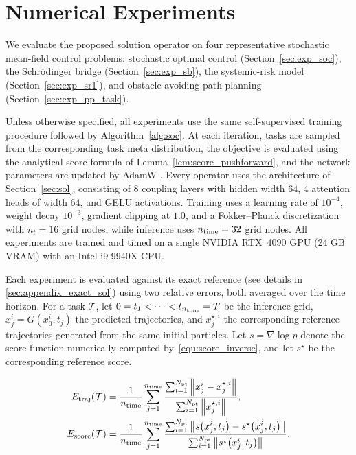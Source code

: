\documentclass[preprint]{elsarticle}
\newcommand{\qb}[1]{\bigl(#1\bigr)}          %
\newcommand{\norm}[1]{\left\|#1\right\|}
\newcommand{\sT}{\mathcal{T}}
\begin{document}
\section{Numerical Experiments}\label{sec:results}

We evaluate the proposed solution operator on four representative stochastic mean-field control problems: stochastic optimal control (Section~\ref{sec:exp_soc}), the Schr\"odinger bridge (Section~\ref{sec:exp_sb}), the systemic-risk model (Section~\ref{sec:exp_sr1}), and obstacle-avoiding path planning (Section~\ref{sec:exp_pp_task}).

Unless otherwise specified, all experiments use the same self-supervised training procedure followed by Algorithm~\ref{alg:soc}. At each iteration, tasks are sampled from the corresponding task meta distribution, the objective is evaluated using the analytical score formula of Lemma~\ref{lem:score_pushforward}, and the network parameters are updated by AdamW \cite{loshchilov2018decoupled}. Every operator uses the architecture of Section~\ref{sec:sol}, consisting of $8$ coupling layers with hidden width $64$, $4$ attention heads of width $64$, and GELU activations. Training uses a learning rate of $10^{-4}$, weight decay $10^{-3}$, gradient clipping at $1.0$, and a Fokker--Planck discretization with $n_{t}=16$ grid nodes, while inference uses $n_{\rm time}=32$ grid nodes. All experiments are trained and timed on a single NVIDIA RTX~4090 GPU (24 GB VRAM) with an Intel i9-9940X CPU.

\label{sec:exp_metrics}
Each experiment is evaluated against its exact reference (see details in \ref{sec:appendix_exact_sol}) using two relative errors, both averaged over the time horizon. For a task $\sT$, let $0=t_1<\cdots<t_{n_{\rm time}}=T$ be the inference grid, $x_j^i=G(x_0^i,t_j)$ the predicted trajectories, and $x_j^{\star,i}$ the corresponding reference trajectories generated from the same initial particles. Let $s=\nabla\log p$ denote the score function numerically computed by~\eqref{equ:score_inverse}, and let $s^\star$ be the corresponding reference score. 

\begin{align}
  E_{\rm traj}(\sT) &= \frac{1}{n_{\rm time}}\sum_{j=1}^{n_{\rm time}}
    \frac{\sum_{i=1}^{N_{\rm pt}}\norm{x^{i}_{j}-x^{\star,i}_{j}}}
         {\sum_{i=1}^{N_{\rm pt}}\norm{x^{\star,i}_{j}}},
    \label{equ:err_traj}\\
  E_{\rm score}(\sT) &= \frac{1}{n_{\rm time}}\sum_{j=1}^{n_{\rm time}}
    \frac{\sum_{i=1}^{N_{\rm pt}}\norm{s\qb{x^{i}_{j},t_j}-s^{\star}\qb{x^{i}_{j},t_j}}}
         {\sum_{i=1}^{N_{\rm pt}}\norm{s^{\star}\qb{x^{i}_{j},t_j}}}.
    \label{equ:err_score}
\end{align}
\end{document}

